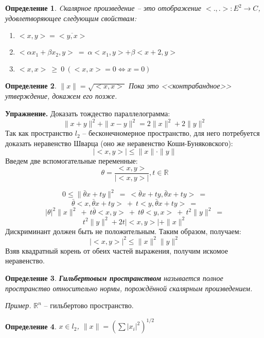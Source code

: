 \documentclass[12pt]{article}
\newcommand{\example}{{\itshape Пример. }}
\newcommand{\equals}{\Leftrightarrow}
\newcommand{\exc}{{\bfseries Упражнение. }}
\renewcommand{\leq}{\leqslant}
\renewcommand{\geq}{\geqslant}
\newtheorem{defi}{Определение}[section]
\begin{document}
	\begin{defi}
		Cкалярное произведение -- это отображение $<.,.> : E^2 \rightarrow C$, удовлетворяющее следующим свойствам:
		\begin{enumerate} 
			\item $<x,y> = \overline{<y,x>}$
			\item $<\alpha x_1 + \beta x_2, y> ~= ~\alpha <x_1, y> + \beta <x+2, y>$
			\item $<x, x> ~\geq ~0 ~(<x, x> = 0 \equals x = 0)$
		\end{enumerate}
	\end{defi}

	\begin{defi}
		$\|x\| = \sqrt{<x, x>}$ {\color{gray} Пока это <<контрабандное>> утверждение, докажем его позже.}
	\end{defi}
	
	\exc Доказать тождество параллелограмма: 
	$$\|x+y\|^2 + \|x-y\|^2 = 2 \|x\|^2 + 2 \|y\|^2$$
	Так как пространство $l_2$ -- бесконечномерное пространство, для него потребуется доказать неравенство Шварца (оно же неравенство
	Коши-Буняковского):
	$$|<x, y>| \leq \|x\| \cdot \|y\|$$
	Введем две вспомогательные переменные:
	$$\theta = \frac{<x, y>}{|<x, y>|}, t \in \mathbb{R}$$
	
	$$0 \leq \|\bar{\theta} x + t y\|^2 ~=~ <\bar{\theta} x + t y, \bar{\theta} x + t y> ~= $$
	$$\bar{\theta} <x, \bar{\theta} x + t y> ~+~ t <y, \bar{\theta} x + t y> ~= $$
	$$|\theta|^2 \|x\|^2 ~+~ t \bar{\theta} <x, y> ~+~ t \theta <y, x> ~+~ t^2 \|y\|^2 ~= $$
	$$t^2 \|y\|^2 + 2t |<x,y>| + \|x\|^2$$
	Дискриминант должен быть не положительным. Таким образом, получаем:
	$$|<x, y>|^2 \leq \|x\|^2 \|y\|^2$$
	Взяв квадратный корень от обеих частей выражения, получим искомое неравенство.
	
	\begin{defi}
		\textbf{Гильбертовым пространством} называется полное пространство относительно нормы, порождённой скалярным произведением.
	\end{defi}
	
	\example $\mathbb{R}^n$ -- гильбертово пространство.
	
	\begin{defi}
		$x \in l_2$, $\|x\| = (\sum{|x_i|^2})^{1/2}$ 
	\end{defi}
\end{document}

